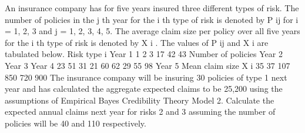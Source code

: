 \documentclass[a4paper,12pt]{article}
\begin{document}
\newpage


An insurance company has for five years insured three different types of risk. The
number of policies in the j th year for the i th type of risk is denoted by P ij for i = 1, 2, 3
and j = 1, 2, 3, 4, 5. The average claim size per policy over all five years for the i th
type of risk is denoted by X i . The values of P ij and X i are tabulated below.
Risk type i Year 1
1
2
3 17
42
43
Number of policies
Year 2
Year 3
Year 4
23
51
31
21
60
62
29
55
98
Year 5 Mean claim size
X i
35
37
107 850
720
900
The insurance company will be insuring 30 policies of type 1 next year and has
calculated the aggregate expected claims to be 25,200 using the assumptions of
Empirical Bayes Credibility Theory Model 2.
Calculate the expected annual claims next year for risks 2 and 3 assuming the number
of policies will be 40 and 110 respectively.
\newpage
\end{document}
